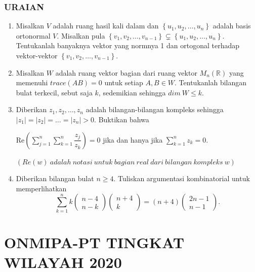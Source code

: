 \documentclass[12pt,twoside]{article}
\begin{document}
\newpage \subsubsection*{URAIAN}
\begin{enumerate}
	\item Misalkan $V$ adalah ruang hasil kali dalam dan $\left\lbrace u_1,u_2,\dots,u_n \right\rbrace$ adalah basis ortonormal $V$. Misalkan pula $\left\lbrace v_1,v_2,\dots,v_{n-1} \right\rbrace \subsetneq \left\lbrace u_1,u_2,\dots,u_n \right\rbrace$. Tentukanlah banyaknya vektor yang normnya 1 dan ortogonal terhadap vektor-vektor $\left\lbrace v_1,v_2,\dots,v_{n-1} \right\rbrace$.

	\item Misalkan $W$ adalah ruang vektor bagian dari ruang vektor $M_n\left(\mathbb{R}\right)$ yang memenuhi $trace\left(AB\right)=0$ untuk setiap $A,B \in W$. Tentukanlah bilangan bulat terkecil, sebut saja $k$, sedemikian sehingga $dim \ W \leq k$.

	\item Diberikan $z_1, z_2, \dots,z_n$ adalah bilangan-bilangan kompleks sehingga $\left|z_1\right| = \left|z_2\right| =\dots= \left|z_n\right| > 0$. Buktikan bahwa
	      \begin{center}
		      Re$\displaystyle\left(\sum_{j=1}^{n}\sum_{k=1}^{n} \dfrac{z_j}{z_k}\right)=0$ jika dan hanya jika $\displaystyle\sum_{k=1}^{n} z_k=0$.
	      \end{center}
	      $\left(Re\left(w\right) \ adalah \ notasi \ untuk \ bagian \ real \ dari \ bilangan \ kompleks \ w\right)$

	\item Diberikan bilangan bulat $n \geq 4$. Tuliskan argumentasi kombinatorial untuk memperlihatkan
	      $$\displaystyle \sum_{k=1}^{n}k \begin{pmatrix} n-4 \\ n-k \end{pmatrix} \begin{pmatrix} n+4 \\ k \end{pmatrix} = \left(n+4\right) \begin{pmatrix} 2n-1 \\ n-1 \end{pmatrix}.$$
\end{enumerate}

\newpage
{}
\section{ONMIPA-PT TINGKAT WILAYAH 2020}
\end{document}

